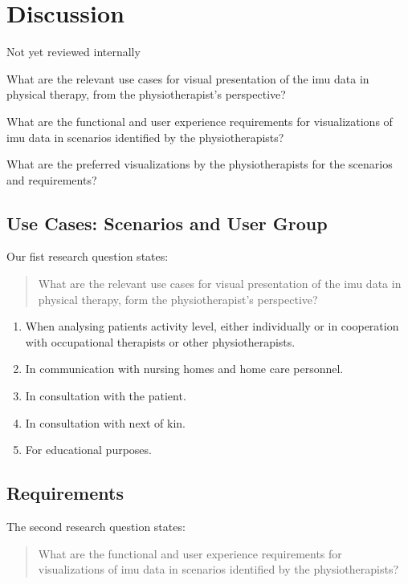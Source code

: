 \chapter{Discussion}
{\Large Not yet reviewed internally}

\begin{description}[parsep=0pt, itemsep=0pt]
\item[Research Question 1:] What are the relevant use cases for visual presentation of the \gls{imu} data in physical therapy, from the physiotherapist's perspective?

\item[Research Question 2:] What are the functional and user experience requirements for visualizations of \gls{imu} data in scenarios identified by the physiotherapists?

\item[Research Question 3:] What are the preferred visualizations by the physiotherapists for the scenarios and requirements?
\end{description}

\section{Use Cases: Scenarios and User Group}
Our fist research question states:
\begin{quote}
What are the relevant use cases for visual presentation of the \gls{imu} data in physical therapy, form the physiotherapist's perspective?
\end{quote}

\begin{enumerate}[itemsep=0cm, parsep=0cm]
\item When analysing patients activity level, either individually or in cooperation with occupational therapists or other physiotherapists.
\item In communication with nursing homes and home care personnel.
\item In consultation with the patient.
\item In consultation with next of kin.
\item For educational purposes.
\end{enumerate}

\section{Requirements}
The second research question states:
\begin{quote}
What are the functional and user experience requirements for visualizations of \gls{imu} data in scenarios identified by the physiotherapists?
\end{quote}

